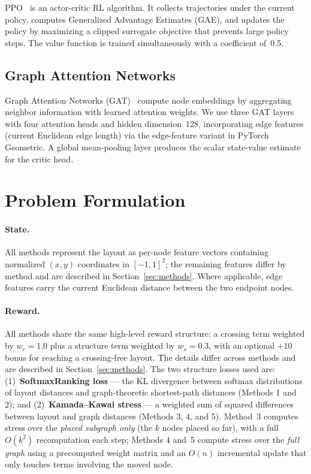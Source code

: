 \documentclass[10pt,twocolumn]{article}
\begin{document}
PPO~\cite{schulman2017ppo} is an actor-critic RL algorithm.  It collects
trajectories under the current policy, computes Generalized Advantage
Estimates (GAE), and updates the policy by maximizing a clipped surrogate
objective that prevents large policy steps.  The value function is trained
simultaneously with a coefficient of~0.5.

\subsection{Graph Attention Networks}

Graph Attention Networks (GAT)~\cite{velickovic2018gat} compute node
embeddings by aggregating neighbor information with learned attention weights.
We use three GAT layers with four attention heads and hidden dimension~128,
incorporating edge features (current Euclidean edge length) via the
edge-feature variant in PyTorch Geometric.  A global mean-pooling layer
produces the scalar state-value estimate for the critic head.

\section{Problem Formulation}
\label{sec:problem}

\paragraph{State.}
All methods represent the layout as per-node feature vectors containing
normalized $(x, y)$ coordinates in $[-1,1]^2$; the remaining features differ
by method and are described in Section~\ref{sec:methods}.
Where applicable, edge features carry the current Euclidean distance between
the two endpoint nodes.

\paragraph{Reward.}
All methods share the same high-level reward structure: a crossing term
weighted by $w_c=1.0$ plus a structure term weighted by $w_s=0.3$, with
an optional $+10$ bonus for reaching a crossing-free layout.  The details
differ across methods and are described in Section~\ref{sec:methods}.
The two structure losses used are: (1)~\textbf{SoftmaxRanking loss} ---
the KL divergence between softmax distributions of layout distances and
graph-theoretic shortest-path distances (Methods 1 and 2); and
(2)~\textbf{Kamada--Kawai stress} --- a weighted sum of squared differences
between layout and graph distances (Methods 3, 4, and 5).  Method~3 computes
stress over the \emph{placed subgraph only} (the $k$ nodes placed so far),
with a full $O(k^2)$ recomputation each step; Methods 4 and~5 compute stress
over the \emph{full graph} using a precomputed weight matrix and an $O(n)$
incremental update that only touches terms involving the moved node.
\end{document}
